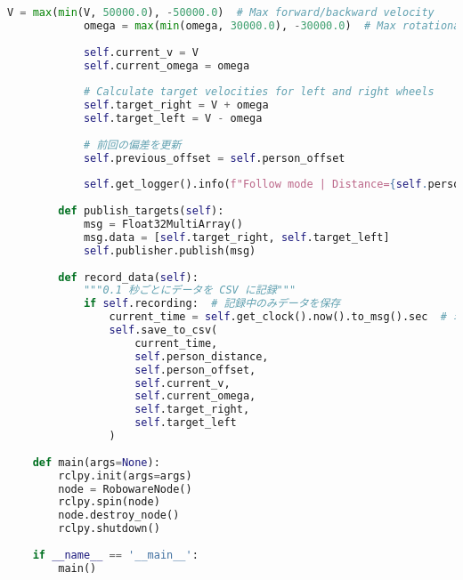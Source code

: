 \begin{lstlisting}[language=Python, caption=Roboware\_node.py]
            V = max(min(V, 50000.0), -50000.0)  # Max forward/backward velocity
            omega = max(min(omega, 30000.0), -30000.0)  # Max rotational velocity
    
            self.current_v = V
            self.current_omega = omega
    
            # Calculate target velocities for left and right wheels
            self.target_right = V + omega
            self.target_left = V - omega
    
            # 前回の偏差を更新
            self.previous_offset = self.person_offset
    
            self.get_logger().info(f"Follow mode | Distance={self.person_distance}, Offset={self.person_offset}, OffsetRate={offset_rate} | Kd={dynamic_kd:.2f} | V={V}, Omega={omega} | Target Right={self.target_right}, Left={self.target_left}")
    
        def publish_targets(self):
            msg = Float32MultiArray()
            msg.data = [self.target_right, self.target_left]
            self.publisher.publish(msg)
    
        def record_data(self):
            """0.1 秒ごとにデータを CSV に記録"""
            if self.recording:  # 記録中のみデータを保存
                current_time = self.get_clock().now().to_msg().sec  # 現在時刻を秒単位で取得
                self.save_to_csv(
                    current_time, 
                    self.person_distance, 
                    self.person_offset, 
                    self.current_v, 
                    self.current_omega, 
                    self.target_right, 
                    self.target_left
                )
    
    def main(args=None):
        rclpy.init(args=args)
        node = RobowareNode()
        rclpy.spin(node)
        node.destroy_node()
        rclpy.shutdown()
    
    if __name__ == '__main__':
        main()
\end{lstlisting}

